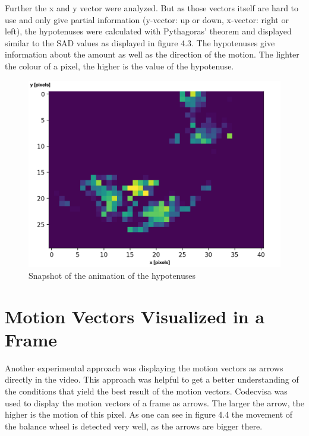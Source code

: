 \documentclass[12pt, a4paper]{report}
\begin{document}
    Further the x and y vector were analyzed. But as those vectors itself are hard to use and only give partial information (y-vector: up or down, x-vector: right or left), the hypotenuses were calculated with Pythagoras' theorem and displayed similar to the SAD values as displayed in figure 4.3. The hypotenuses give information about the amount as well as the direction of the motion. The lighter the colour of a pixel, the higher is the value of the hypotenuse.
 
        \noindent
    \begin{figure}[H]
    \centering
    \includegraphics[scale=0.6]{Images/animation_hypotenuse.png}
    
    \caption{Snapshot of the animation of the hypotenuses}
    \end{figure}
    
    \pagebreak
    
    \section{Motion Vectors Visualized in a Frame}
        Another experimental approach was displaying the motion vectors as arrows directly in the video. This approach was helpful to get a better understanding of the conditions that yield the best result of the motion vectors.
    Codecvisa was used to display the motion vectors of a frame as arrows. The larger the arrow, the higher is the motion of this pixel. As one can see in figure 4.4 the movement of the balance wheel is detected very well, as the arrows are bigger there.
 
\end{document}

